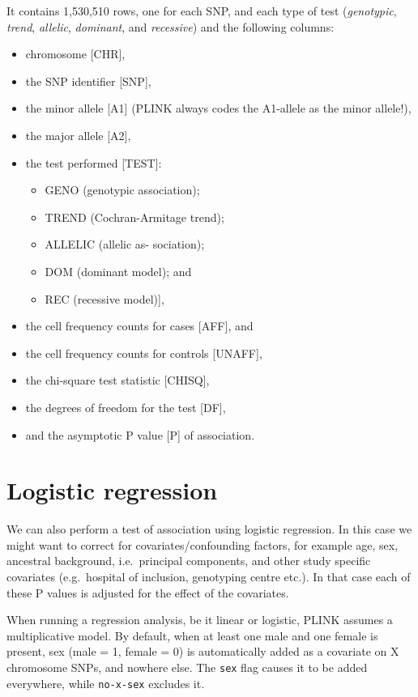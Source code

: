 \documentclass[
]{book}
\providecommand{\tightlist}{%
  \setlength{\itemsep}{0pt}\setlength{\parskip}{0pt}}
\begin{document}
It contains 1,530,510 rows, one for each SNP, and each type of test (\emph{genotypic}, \emph{trend}, \emph{allelic}, \emph{dominant}, and \emph{recessive}) and the following columns:

\begin{itemize}
\tightlist
\item
  chromosome {[}CHR{]},
\item
  the SNP identifier {[}SNP{]},
\item
  the minor allele {[}A1{]} (PLINK always codes the A1-allele as the minor allele!),
\item
  the major allele {[}A2{]},
\item
  the test performed {[}TEST{]}:

  \begin{itemize}
  \tightlist
  \item
    GENO (genotypic association);
  \item
    TREND (Cochran-Armitage trend);
  \item
    ALLELIC (allelic as- sociation);
  \item
    DOM (dominant model); and
  \item
    REC (recessive model){]},
  \end{itemize}
\item
  the cell frequency counts for cases {[}AFF{]}, and
\item
  the cell frequency counts for controls {[}UNAFF{]},
\item
  the chi-square test statistic {[}CHISQ{]},
\item
  the degrees of freedom for the test {[}DF{]},
\item
  and the asymptotic P value {[}P{]} of association.
\end{itemize}

\hypertarget{logistic-regression}{%
\section{Logistic regression}\label{logistic-regression}}

We can also perform a test of association using logistic regression. In this case we might want to correct for covariates/confounding factors, for example age, sex, ancestral background, i.e.~principal components, and other study specific covariates (e.g.~hospital of inclusion, genotyping centre etc.). In that case each of these P values is adjusted for the effect of the covariates.

When running a regression analysis, be it linear or logistic, PLINK assumes a multiplicative model. By default, when at least one male and one female is present, sex (male = 1, female = 0) is automatically added as a covariate on X chromosome SNPs, and nowhere else. The \texttt{sex} flag causes it to be added everywhere, while \texttt{no-x-sex} excludes it.
\end{document}
